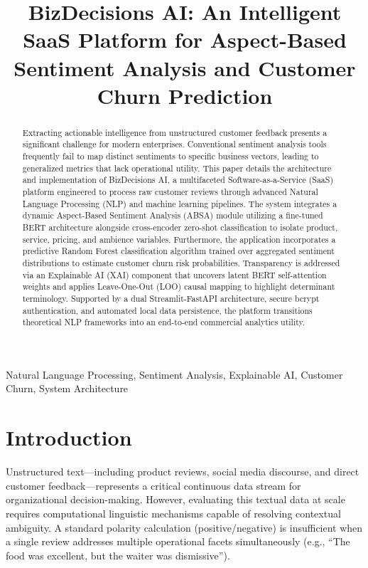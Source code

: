 \documentclass[conference]{IEEEtran}
\begin{document}
\title{BizDecisions AI: An Intelligent SaaS Platform for Aspect-Based Sentiment Analysis and Customer Churn Prediction}

\author{
}

\maketitle

\begin{abstract}
Extracting actionable intelligence from unstructured customer feedback presents a significant challenge for modern enterprises. Conventional sentiment analysis tools frequently fail to map distinct sentiments to specific business vectors, leading to generalized metrics that lack operational utility. This paper details the architecture and implementation of BizDecisions AI, a multifaceted Software-as-a-Service (SaaS) platform engineered to process raw customer reviews through advanced Natural Language Processing (NLP) and machine learning pipelines. The system integrates a dynamic Aspect-Based Sentiment Analysis (ABSA) module utilizing a fine-tuned BERT architecture alongside cross-encoder zero-shot classification to isolate product, service, pricing, and ambience variables. Furthermore, the application incorporates a predictive Random Forest classification algorithm trained over aggregated sentiment distributions to estimate customer churn risk probabilities. Transparency is addressed via an Explainable AI (XAI) component that uncovers latent BERT self-attention weights and applies Leave-One-Out (LOO) causal mapping to highlight determinant terminology. Supported by a dual Streamlit-FastAPI architecture, secure bcrypt authentication, and automated local data persistence, the platform transitions theoretical NLP frameworks into an end-to-end commercial analytics utility.
\end{abstract}

\begin{IEEEkeywords}
Natural Language Processing, Sentiment Analysis, Explainable AI, Customer Churn, System Architecture
\end{IEEEkeywords}

\section{Introduction}
Unstructured text—including product reviews, social media discourse, and direct customer feedback—represents a critical continuous data stream for organizational decision-making. However, evaluating this textual data at scale requires computational linguistic mechanisms capable of resolving contextual ambiguity. A standard polarity calculation (positive/negative) is insufficient when a single review addresses multiple operational facets simultaneously (e.g., ``The food was excellent, but the waiter was dismissive''). 
\end{document}
